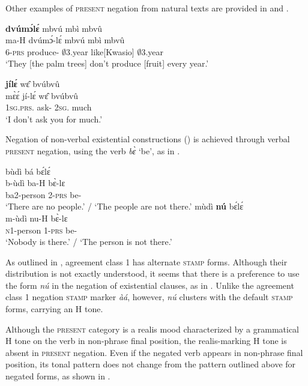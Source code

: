 \noindent Other examples of \textsc{present} negation  from natural texts are provided in  and .


\ea\label{leA}
   {\bfseries dvúmɔ́lɛ́} mbvú mbì mbvû \\
        ma-H dvúmɔ́-lɛ́ mbvú mbì mbvû \\
           6-\textsc{prs} produce-{\NEG}  $\emptyset$3.year like[Kwasio] $\emptyset$3.year\\
    \trans `They [the palm trees] don't produce [fruit] every year.'
\z

\ea\label{leB}
   {\bfseries jílɛ́} wɛ̂ bvúbvû \\
       mɛ̀ɛ́ jí-lɛ́ wɛ̂ bvúbvû \\
         1\textsc{sg}.\textsc{prs}.{\NEG} ask-{\NEG} 2\textsc{sg}.{\OBJ} much\\
    \trans `I don't ask you for much.'
\z

Negation of non-verbal existential constructions () is achieved through verbal \textsc{present} negation, using the verb {\itshape bɛ̀} `be', as in .

\ea\label{leOM}
\ea \label{leOMa}
  \glll  bùdì bá bɛ́lɛ́   \\
        b-ùdì ba-H bɛ̀-lɛ \\
         ba2-person 2-\textsc{prs} be-{\NEG}        \\
    \trans `There are no people.' / `The people are not there.'
\ex\label{leOMb}
  \glll  mùdì {\bfseries nú} bɛ́lɛ́  \\
        m-ùdì nu-H bɛ̀-lɛ \\
         \textsc{n}1-person 1-\textsc{prs} be-{\NEG}        \\
    \trans `Nobody is there.' / `The person is not there.'
\z
\z

As outlined in , agreement class 1 has alternate \textsc{stamp} forms. Although their distribution is not exactly understood, it seems that there is a preference to use the form {\itshape nú} in the negation of existential clauses, as in . Unlike the agreement class 1 negation \textsc{stamp} marker {\itshape àá}, however, {\itshape nú} clusters with the default \textsc{stamp} forms, carrying an H tone.




Although the \textsc{present} category is a realis mood characterized by a grammatical H tone on the verb in non-phrase final position, the realis-marking H tone is absent in \textsc{present} negation. Even if the negated verb appears in non-phrase final position, its tonal pattern does not change from the pattern outlined above for negated forms, as shown in .

